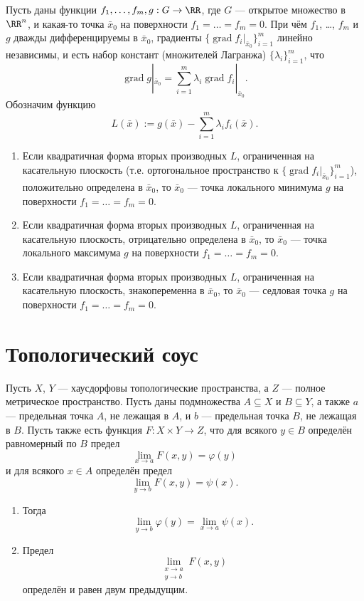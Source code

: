 \documentclass[12pt,a4paper]{article}
\DeclareMathOperator{\grad}{grad}
\begin{document}
    \begin{theorem}
        Пусть даны функции $f_1, \dots, f_m, g: G \to \RR$, где $G$ --- открытое множество в $\RR^n$, и какая-то точка $\bar{x}_0$ на поверхности $f_1 = \dots = f_m = 0$. При чём $f_1$, \dots, $f_m$ и $g$ дважды дифференцируемы в $\bar{x}_0$, градиенты $\{\grad f_i|_{\bar{x}_0}\}_{i=1}^m$ линейно независимы, и есть набор констант (множителей Лагранжа) $\{\lambda_i\}_{i=1}^m$, что
        \[\grad g|_{\bar{x}_0} = \sum_{i=1}^m \lambda_i \grad f_i|_{\bar{x}_0}.\]
        Обозначим функцию
        \[L(\bar{x}) := g(\bar{x}) - \sum_{i=1}^m \lambda_i f_i(\bar{x}).\]
        \begin{enumerate}
            \item Если квадратичная форма вторых производных $L$, ограниченная на касательную плоскость (т.е. ортогональное пространство к $\{\grad f_i|_{\bar{x}_0}\}_{i=1}^m$), положительно определена в $\bar{x}_0$, то $\bar{x}_0$ --- точка локального минимума $g$ на поверхности $f_1 = \dots = f_m = 0$.
            \item Если квадратичная форма вторых производных $L$, ограниченная на касательную плоскость, отрицательно определена в $\bar{x}_0$, то $\bar{x}_0$ --- точка локального максимума $g$ на поверхности $f_1 = \dots = f_m = 0$.
            \item Если квадратичная форма вторых производных $L$, ограниченная на касательную плоскость, знакопеременна в $\bar{x}_0$, то $\bar{x}_0$ --- седловая точка $g$ на поверхности $f_1 = \dots = f_m = 0$.
        \end{enumerate}
    \end{theorem}
    

    \section{Топологический соус}

    \begin{theorem}
        Пусть $X$, $Y$ --- хаусдорфовы топологические пространства, а $Z$ --- полное метрическое пространство. Пусть даны подмножества $A \subseteq X$ и $B \subseteq Y$, а также $a$ --- предельная точка $A$, не лежащая в $A$, и $b$ --- предельная точка $B$, не лежащая в $B$. Пусть также есть функция $F: X \times Y \to Z$, что для всякого $y \in B$ определён равномерный по $B$ предел
        \[\lim_{x \to a} F(x, y) = \varphi(y)\]
        и для всякого $x \in A$ определён предел
        \[\lim_{y \to b} F(x, y) = \psi(x).\]
        \begin{enumerate}
            \item Тогда
                \[\lim_{y \to b} \varphi(y) = \lim_{x \to a} \psi(x).\]
            \item Предел
                \[\lim_{\substack{x \to a\\ y \to b}} F(x, y)\]
                определён и равен двум предыдущим.
        \end{enumerate}
    \end{theorem}
\end{document}

